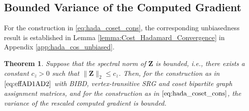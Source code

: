 \documentclass[journal,draftcls,onecolumn]{IEEEtran}
\theoremstyle{mystyle}
\newtheorem{thm}{Theorem}
\begin{document}
\subsection{Bounded Variance of the Computed Gradient}

For the construction in \eqref{eq:hada_coset_cons}, the corresponding unbiasedness result is established in Lemma \ref{lemma:Cost_Hadamard_Convergence} in Appendix \ref{app:hada_cos_unbiased}.


\begin{thm}
\label{thm:Bound_variance}
Suppose that the spectral norm of $\mathbf{Z}$ is bounded, i.e.,
there exists a constant $c_z>0$ such that $\|\mathbf{Z}\|_2\leq c_z$. Then, for the construction as in $\eqref{eq:effAD1AD2}$ with BIBD, vertex-transitive SRG and coset bipartite graph assignment matrices, and for the construction as in $\eqref{eq:hada_coset_cons}$, the variance of the rescaled computed gradient is bounded.
\end{thm}
\end{document}
